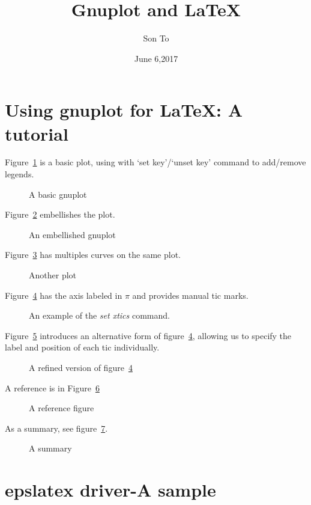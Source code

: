 \documentclass[a4paper,11pt]{article}
\title{Gnuplot and LaTeX}
\author{Son To}
\date{June 6,2017}
\begin{document}
\maketitle
\tableofcontents
\newpage
\section{Using gnuplot for LaTeX: A tutorial}
Figure~\ref{fig:eg1} is a basic plot, using with `set key'/`unset key'
command to add/remove legends.
  \begin{figure}
    \begin{center}
      
      \caption{A basic gnuplot}
      \label{fig:eg1}
    \end{center}
  \end{figure}

Figure~\ref{fig:eg2} embellishes the plot.
\begin{figure}
  \begin{center}
    
    \caption{An embellished gnuplot}
    \label{fig:eg2}
  \end{center}
\end{figure}

Figure~\ref{fig:eg3} has multiples curves on the same plot.
\begin{figure}
  \begin{center}
    
    \caption{Another plot}
    \label{fig:eg3}
  \end{center}
\end{figure}

Figure~\ref{fig:eg4} has the axis labeled in $\pi$
and provides manual tic marks.
\begin{figure}
\begin{center}
  
  \caption{An example of the \emph{set xtics} command.}
  \label{fig:eg4}
\end{center}
\end{figure}

Figure~\ref{fig:eg5} introduces an alternative form of
figure~\ref{fig:eg4}, allowing us to specify the label
and position of each tic individually.
\begin{figure}
\begin{center}
  
  \caption{A refined version of figure~\ref{fig:eg4}}
  \label{fig:eg5}
\end{center}
\end{figure}

A reference is in Figure~\ref{fig:ref}
\begin{figure}
  \begin{center}
  
  \caption{A reference figure}
  \label{fig:ref}
\end{center}
\end{figure}

As a summary, see figure~\ref{fig:sum}.
\begin{figure}
\begin{center}
  
  \caption{A summary}
  \label{fig:sum}
\end{center}
\end{figure}
\newpage
\section{epslatex driver-A sample}
\end{document}
